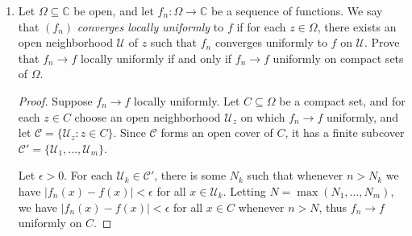 \documentclass[10pt]{article}
\newcommand{\C}{\mathbb{C}}
\newcommand{\U}{\mathcal{U}}
\newcommand{\Int}{\displaystyle\int}
\begin{document}
\begin{enumerate}
\begin{enumerate}
\begin{proof}
Now, let $\epsilon > 0$, and let $N_2$ be such that whenever $n > N_2$, we have $|f_n(x) - f(x)| < \frac{a^2}{2} \epsilon$ for all $x \in E$.  Then, whenever $n > \max(N_1, N_2)$, we have
$$
\left| \frac{1}{f_n(x)} - \frac{1}{f(x)} \right| = \frac{|f(x) - f_n(x)|}{|f(x)||f_n(x)|} < \frac{\frac{a^2}{2}\epsilon}{\frac{a}{2}a} = \epsilon.
$$
\end{proof}
\item Suppose $E$ is the image of a piecewise-$C^1$ path $\gamma$, and suppose each $f_n$ is continuous.  Prove that $\Int_{\gamma} f_n(z) dz \rightarrow \Int_{\gamma} f(z) dz$.

\begin{proof}
Let $\epsilon > 0$.  There exists some $N$ such that, whenever $n > N$ we have $|f_n(z) - f(z)| < \frac{\epsilon}{L(\gamma)}$ for all $z \in E$.  This gives
\begin{align*}
\left| \Int_\gamma f_n(z)dz - \Int_\gamma f(z)dz \right| &= \left| \Int_\gamma f_n(z) - f(z)dz \right| \leq  \Int_\gamma |f_n(z) - f(z)| dz \leq \Int_{\gamma} \frac{\epsilon}{L(\gamma)}dz = \epsilon.
\end{align*}
Without uniform convergence, the second inequality would not hold.
\end{proof}
\end{enumerate}

\item Let $\Omega \subseteq \C$ be open, and let $f_n: \Omega \rightarrow \C$ be a sequence of functions.  We say that $(f_n)$ \emph{converges locally uniformly} to $f$ if for each $z \in \Omega$, there exists an open neighborhood $\mathcal{U}$ of $z$ such that $f_n$ converges uniformly to $f$ on $\mathcal{U}$.  Prove that $f_n \rightarrow f$ locally uniformly if and only if $f_n \rightarrow f$ uniformly on compact sets of $\Omega$.

\begin{proof}
Suppose $f_n \rightarrow f$ locally uniformly.  Let $C \subseteq \Omega$ be a compact set, and for each $z \in C$ choose an open neighborhood $\U_z$ on which $f_n \rightarrow f$ uniformly, and let $\mathscr{C} = \{\U_z : z \in C \}$.  Since $\mathscr{C}$ forms an open cover of $C$, it has a finite subcover $\mathscr{C}' = \{\U_1, \dots, \U_m \}$.

Let $\epsilon > 0$.  For each $\U_k \in \mathscr{C}'$, there is some $N_k$ such that whenever $n > N_k$ we have $|f_n(x) - f(x)| < \epsilon$ for all $x \in \U_k$.  Letting $N = \max(N_1, \dots , N_m)$, we have $|f_n(x) - f(x)| < \epsilon$ for all $x \in C$ whenever $n > N$, thus $f_n \rightarrow f$ uniformly on $C$.


\end{proof}
\end{enumerate}
\end{document}
